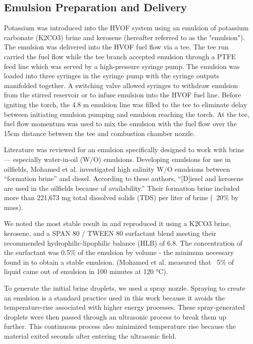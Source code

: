 \clearpage
\subsection{Emulsion Preparation and Delivery}

Potassium was introduced into the HVOF system using an emulsion of potassium carbonate (K2CO3) brine and kerosene (hereafter referred to as the "emulsion"). The emulsion was delivered into the HVOF fuel flow via a tee. The tee run carried the fuel flow while the tee branch accepted emulsion through a PTFE feed line which was served by a high-pressure syringe pump. The emulsion was loaded into three syringes in the syringe pump with the syringe outputs manifolded together. A switching valve allowed syringes to withdraw emulsion from the stirred reservoir or to infuse emulsion into the HVOF fuel line. Before igniting the torch, the 4.8 m emulsion line was filled to the tee to eliminate delay between initiating emulsion pumping and emulsion reaching the torch. At the tee, fuel flow momentum was used to mix the emulsion with the fuel flow over the 15cm distance between the tee and combustion chamber nozzle. 

Literature was reviewed for an emulsion specifically designed to work with brine — especially water-in-oil (W/O) emulsions. Developing emulsions for use in oilfields, Mohamed et al.\cite{mohamedInfluenceSurfactantStructure2017a} investigated high salinity W/O emulsions between “formation brine” and diesel. According to these authors, “[D]iesel and kerosene are used in the oilfields because of availability.” Their formation brine included more than 221,673 mg total dissolved solids (TDS) per liter of brine (~20\% by mass).  

We noted the most stable result in \cite{mohamedInfluenceSurfactantStructure2017a} and reproduced it using a K2CO3 brine, kerosene, and a SPAN 80 / TWEEN 80 surfactant blend meeting their recommended hydrophilic-lipophilic balance (HLB) of 6.8. The concentration of the surfactant was 0.5\% of the emulsion by volume - the minimum necessary found in \cite{mohamedInfluenceSurfactantStructure2017a} to obtain a stable emulsion. (Mohamed et al. measured that ~5\% of liquid came out of emulsion in 100 minutes at 120 °C).  

To generate the initial brine droplets, we used a spray nozzle. Spraying to create an emulsion is a standard practice used in this work because it avoids the temperature-rise associated with higher energy processes. \cite{atkinsonKeroseneEmulsionHow1890} These spray-generated droplets were then passed through an ultrasonic process to break them up further. This continuous process also minimized temperature rise because the material exited seconds after entering the ultrasonic field. 

